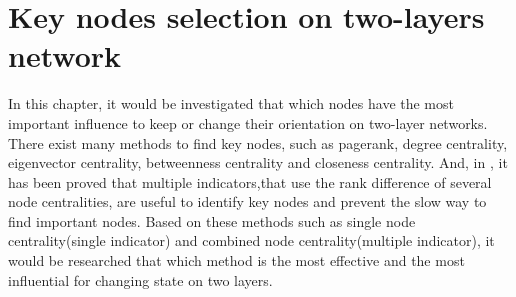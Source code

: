 
\chapter{Key nodes selection on two-layers network}
\label{chap5}
In this chapter, it would be investigated that which nodes have the most important influence to keep or change their orientation on two-layer networks. There exist many methods to find key nodes, such as pagerank, degree centrality, eigenvector centrality, betweenness centrality and closeness centrality. And, in \parencite{mesgari2015, huang2014}, it has been proved that multiple indicators,that use the rank difference of several node centralities, are useful to identify key nodes and prevent the slow way to find important nodes. Based on these methods such as single node centrality(single indicator) and combined node centrality(multiple indicator), it would be researched that which method is the most effective and the most influential for changing state on two layers.  

